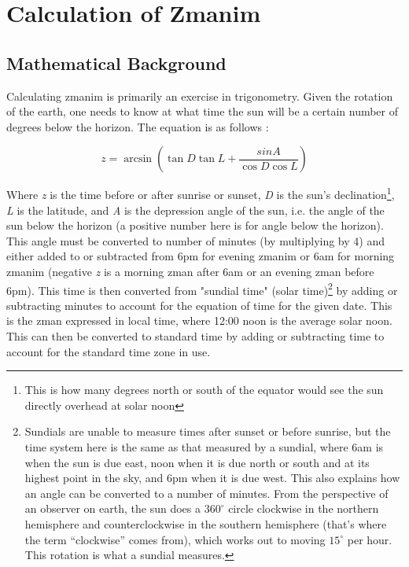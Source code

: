 \chapter{Calculation of Zmanim}

\section{Mathematical Background}

Calculating zmanim is primarily an exercise in trigonometry. Given the rotation of the earth, one needs to know at what time the sun will be a certain number of degrees below the horizon. The equation is as follows \parencite{times}:

\begin{displaymath}
	z = \arcsin\left({\tan{D}\tan{L} + \frac{sin{A}}{\cos{D}\cos{L}}}\right)
\end{displaymath}

Where \textit{z} is the time before or after sunrise or sunset, \textit{D} is the sun's declination\footnote{This is how many degrees north or south of the equator would see the sun directly overhead at solar noon}, \textit{L} is the latitude, and \textit{A} is the depression angle of the sun, i.e. the angle of the sun below the horizon (a positive number here is for angle below the horizon). This angle must be converted to number of minutes (by multiplying by 4) and either added to or subtracted from 6pm for evening zmanim or 6am for morning zmanim (negative \textit{z} is a morning zman after 6am or an evening zman before 6pm). This time is then converted from "sundial time" (solar time)\footnote{Sundials are unable to measure times after sunset or before sunrise, but the time system here is the same as that measured by a sundial, where 6am is when the sun is due east, noon when it is due north or south and at its highest point in the sky, and 6pm when it is due west. This also explains how an angle can be converted to a number of minutes. From the perspective of an observer on earth, the sun does a $360^{\circ}$ circle clockwise in the northern hemisphere and counterclockwise in the southern hemisphere (that's where the term ``clockwise'' comes from), which works out to moving $15^{\circ}$ per hour. This rotation is what a sundial measures.} by adding or subtracting minutes to account for the equation of time for the given date. This is the zman expressed in local time, where 12:00 noon is the average solar noon. This can then be converted to standard time by adding or subtracting time to account for the standard time zone in use.

